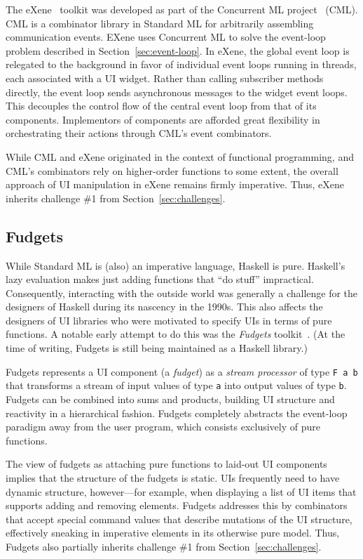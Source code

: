 \documentclass[sigplan,screen]{acmart}
\begin{document}
The eXene~\cite{eXene} toolkit was developed as part of the Concurrent
ML project~\cite{ConcurrentML} (CML).  CML is a combinator library in
Standard ML for arbitrarily assembling communication events.  EXene
uses Concurrent ML to solve the event-loop problem described in
Section~\ref{sec:event-loop}.  In eXene, the global event loop is
relegated to the background in favor of individual event loops running
in threads, each associated with a UI widget.  Rather than calling
subscriber methods directly, the event loop sends asynchronous
messages to the widget event loops.  This decouples the control flow
of the central event loop from that of its components.  Implementors
of components are afforded great flexibility in orchestrating their
actions through CML's event combinators.

While CML and eXene originated in the context of functional
programming, and CML's combinators rely on higher-order functions to
some extent, the overall approach of UI manipulation in eXene remains
firmly imperative.  Thus, eXene inherits challenge \#1 from Section~\ref{sec:challenges}.

\subsection{Fudgets}

While Standard ML is (also) an imperative language, Haskell is pure.
Haskell's lazy evaluation makes just adding functions that ``do
stuff'' impractical.  Consequently, interacting with the outside world
was generally a challenge for the designers of Haskell during its
nascency in the 1990s.  This also affects the designers of UI
libraries who were motivated to specify UIs in terms of pure
functions.  A notable early attempt to do this was the
\textit{Fudgets} toolkit~\cite{Fudgets}.  (At the time of writing,
Fudgets is still being maintained as a Haskell library.)

Fudgets represents a UI component (a \textit{fudget}) as a
\textit{stream processor} of type \verb|F a b| that transforms a
stream of input values of type \texttt{a} into output values of type
\texttt{b}.  Fudgets can be combined into sums and products, building
UI structure and reactivity in a hierarchical fashion.  Fudgets
completely abstracts the event-loop paradigm away from the user
program, which consists exclusively of pure functions.

The view of fudgets as attaching pure functions to laid-out UI
components implies that the structure of the fudgets is static.  UIs
frequently need to have dynamic structure, however---for example, when
displaying a list of UI items that supports adding and removing
elements.  Fudgets addresses this by combinators that accept special
command values that describe mutations of the UI structure,
effectively sneaking in imperative elements in its otherwise pure
model.  Thus, Fudgets also partially inherits challenge \#1 from
Section~\ref{sec:challenges}.
\end{document}
